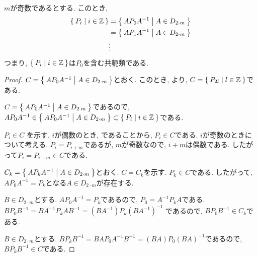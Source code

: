 \begin{prop}
  \label{lem:i2m:conjclass:odd}
  $m$が奇数であるとする.
  このとき,
  \begin{align*}
    \Set{P_i | i \in \mathbb{Z}}
    &= \Set{AP_0A^{-1} | A\in D_{2\cdot m}}\\
    &= \Set{AP_1A^{-1} | A\in D_{2\cdot m}}\\
    &\vdots
  \end{align*}
  つまり, $\Set{P_i | i \in \mathbb{Z}}$は$P_0$を含む共軛類である.
\end{prop}
\begin{proof}
  $C=\Set{AP_0A^{-1} | A\in D_{2\cdot m}}$とおく.
  このとき, より,
  $C=\Set{P_{2l}| l \in \mathbb{Z}}$である.

  $C=\Set{AP_0A^{-1} | A\in D_{2\cdot m}}$であるので,
  $AP_0A^{-1}\in \Set{AP_0A^{-1} | A\in D_{2\cdot m}} \subset \Set{P_i | i \in \mathbb{Z}}$である.

  $P_{i}\in C$
  を示す.
  $i$が偶数のとき,
  であることから, $P_{i}\in C$である.
  $i$が奇数のときについて考える.
  $P_{i}=P_{i+m}$であるが,
  $m$が奇数なので, $i+m$は偶数である.
  したがって$P_{i}=P_{i+m}\in C$である.

  
  $C_k=\Set{AP_kA^{-1} | A\in D_{2\cdot m}}$とおく.
  $C=C_k$を示す.
  $P_k\in C$である.
  したがって, $AP_0A^{-1}=P_k$となる$A\in D_{2\cdot m}$が存在する.

  
  $B\in D_{2\cdot m}$とする.
  $AP_0A^{-1}=P_k$であるので,
  $P_0=A^{-1}P_k A$である.
  $BP_0B^{-1}=BA^{-1}P_k AB^{-1}=(BA^{-1})P_k(BA^{-1})^{-1}$
  であるので, $BP_0B^{-1}\in C_k$である.
  
  $B\in D_{2\cdot m}$とする.
  $BP_k B^{-1}=BAP_0A^{-1}B^{-1}=(BA)P_0(BA)^{-1}$であるので,
  $BP_k B^{-1}\in C$である.
  
\end{proof}

